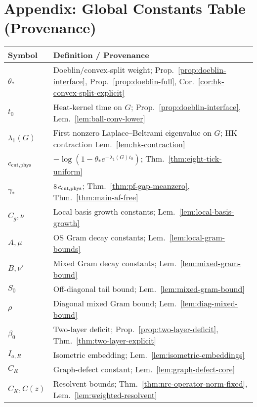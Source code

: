\documentclass[11pt]{amsart}
\theoremstyle{plain}
\theoremstyle{definition}
\theoremstyle{remark}
\begin{document}
\section*{Appendix: Global Constants Table (Provenance)}
\begin{mdframed}[linewidth=0.8pt, linecolor=black!30, backgroundcolor=gray!3, roundcorner=3pt, innertopmargin=10pt, innerbottommargin=10pt, skipabove=12pt, skipbelow=12pt]
\renewcommand{\arraystretch}{1.35}
\begin{center}
\begin{tabular}{@{}lp{8.8cm}@{}}
\toprule
\textbf{Symbol} & \textbf{Definition / Provenance} \\
\midrule
$\theta_*$ & Doeblin/convex-split weight; Prop.~\ref{prop:doeblin-interface}, Prop.~\ref{prop:doeblin-full}, Cor.~\ref{cor:hk-convex-split-explicit} \\
$t_0$ & Heat-kernel time on $G$; Prop.~\ref{prop:doeblin-interface}, Lem.~\ref{lem:ball-conv-lower} \\
$\lambda_1(G)$ & First nonzero Laplace--Beltrami eigenvalue on $G$; HK contraction Lem.~\ref{lem:hk-contraction} \\
$c_{\rm cut,phys}$ & $-\log(1-\theta_* e^{-\lambda_1(G) t_0})$; Thm.~\ref{thm:eight-tick-uniform} \\
$\gamma_*$ & $8\,c_{\rm cut,phys}$; Thm.~\ref{thm:pf-gap-meanzero}, Thm.~\ref{thm:main-af-free} \\
$C_g,\nu$ & Local basis growth constants; Lem.~\ref{lem:local-basis-growth} \\
$A,\mu$ & OS Gram decay constants; Lem.~\ref{lem:local-gram-bounds} \\
$B,\nu'$ & Mixed Gram decay constants; Lem.~\ref{lem:mixed-gram-bound} \\
$S_0$ & Off-diagonal tail bound; Lem.~\ref{lem:mixed-gram-bound} \\
$\rho$ & Diagonal mixed Gram bound; Lem.~\ref{lem:diag-mixed-bound} \\
$\beta_0$ & Two-layer deficit; Prop.~\ref{prop:two-layer-deficit}, Thm.~\ref{thm:two-layer-explicit} \\
$I_{a,R}$ & Isometric embedding; Lem.~\ref{lem:isometric-embeddings} \\
$C_R$ & Graph-defect constant; Lem.~\ref{lem:graph-defect-core} \\
$C_K, C(z)$ & Resolvent bounds; Thm.~\ref{thm:nrc-operator-norm-fixed}, Lem.~\ref{lem:weighted-resolvent} \\
\bottomrule
\end{tabular}
\end{center}
\end{mdframed}
\end{document}
